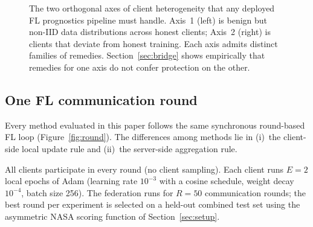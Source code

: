 \documentclass[a4paper,fleqn,doubleblind]{cas-sc}
\begin{document}
\begin{figure}[pos=htbp]
\centering
{}
\caption{The two orthogonal axes of client heterogeneity that any deployed FL prognostics pipeline must handle. Axis~1 (left) is benign but non-IID data distributions across honest clients; Axis~2 (right) is clients that deviate from honest training. Each axis admits distinct families of remedies. Section~\ref{sec:bridge} shows empirically that remedies for one axis do not confer protection on the other.}
\label{fig:two-axis}
\end{figure}

\subsection{One FL communication round}
\label{subsec:one-round}

Every method evaluated in this paper follows the same synchronous
round-based FL loop (Figure~\ref{fig:round}). The differences among
methods lie in (i)~the client-side local update rule and (ii)~the
server-side aggregation rule.

All clients participate in every round (no client sampling). Each
client runs $E = 2$ local epochs of Adam
(learning rate $10^{-3}$ with a cosine schedule, weight decay
$10^{-4}$, batch size 256). The federation runs for
$R = 50$ communication rounds; the best round per experiment is
selected on a held-out combined test set using the asymmetric
NASA scoring function of Section~\ref{sec:setup}.
\end{document}
